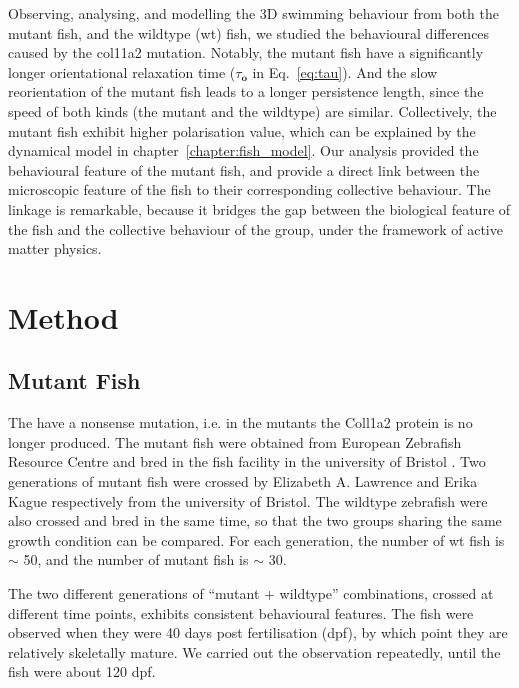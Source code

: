 \documentclass[11pt,twoside]{report}
\begin{document}
Observing, analysing, and modelling the 3D swimming behaviour from both the mutant fish, and the wildtype (\gls{wt}) fish, we studied the behavioural differences caused by the col11a2 mutation. Notably, the mutant fish have a significantly longer orientational relaxation time ($\tau_\mathbf{o}$ in Eq.~\ref{eq:tau}). And the slow reorientation of the mutant fish leads to a longer persistence length, since the speed of both kinds (the mutant and the wildtype) are similar. Collectively, the mutant fish exhibit higher polarisation value, which can be explained by the dynamical model in chapter~\ref{chapter:fish_model}. Our analysis provided the behavioural feature of the mutant fish, and provide a direct link between the microscopic feature of the fish to their corresponding collective behaviour.
The linkage is remarkable, because it bridges the gap between the biological feature of the fish and the collective behaviour of the group, under the framework of active matter physics.


\section{Method}

\subsection{Mutant Fish}

The {\mf} have a nonsense mutation, i.e. in the mutants the Coll1a2 protein is no longer produced. The mutant fish were obtained from European Zebrafish Resource Centre and bred in the fish facility in the university of Bristol \cite{lawrence2018}. Two generations of mutant fish were crossed by Elizabeth A. Lawrence and Erika Kague respectively from the university of Bristol. The wildtype zebrafish were also crossed and bred in the same time, so that the two groups sharing the same growth condition can be compared. For each generation, the number of wt fish is $\sim$ 50, and the number of mutant fish is $\sim$ 30. 

The two different generations of ``mutant + wildtype'' combinations, crossed at different time points, exhibits consistent behavioural features. The fish were observed when they were 40 days post fertilisation (\gls{dpf}), by which point they are relatively skeletally mature. We carried out the observation repeatedly, until the fish were about 120 dpf.
\end{document}
